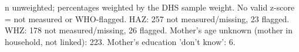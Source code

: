 \begin{minipage}{\linewidth}
\vspace{.05em}
n unweighted; percentages weighted by the DHS sample weight. No valid z-score = not measured or WHO-flagged. HAZ: 257 not measured/missing, 23 flagged. WHZ: 178 not measured/missing, 26 flagged. Mother's age unknown (mother in household, not linked): 223. Mother's education 'don't know': 6.\\
\end{minipage}
\endgroup

